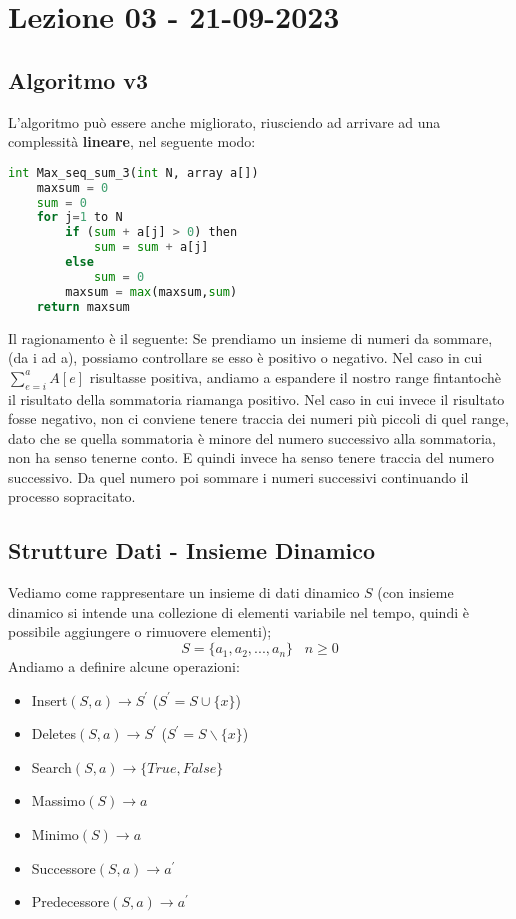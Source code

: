 \section{Lezione 03 - 21-09-2023}

\subsection{Algoritmo v3}
L'algoritmo può essere anche migliorato, riusciendo ad arrivare ad una complessità \textbf{lineare}, nel seguente modo:

\begin{lstlisting}[language=Python]
int Max_seq_sum_3(int N, array a[])
	maxsum = 0
	sum = 0
	for j=1 to N
		if (sum + a[j] > 0) then
			sum = sum + a[j]
		else
			sum = 0
		maxsum = max(maxsum,sum)
	return maxsum
\end{lstlisting}
Il ragionamento è il seguente:
Se prendiamo un insieme di numeri da sommare, (da i ad a), possiamo controllare se esso è positivo o negativo.
Nel caso in cui $\sum_{e=i}^{a} A[e]$ risultasse positiva, andiamo a espandere il nostro range fintantochè il risultato della sommatoria riamanga positivo.
Nel caso in cui invece il risultato fosse negativo, non ci conviene tenere traccia dei numeri più piccoli di quel range, dato che se quella sommatoria è minore del numero successivo alla sommatoria, non ha senso tenerne conto. E quindi invece ha senso tenere traccia del numero successivo. Da quel numero poi sommare i numeri successivi continuando il processo sopracitato.


\subsection{Strutture Dati - Insieme Dinamico}
Vediamo come rappresentare un insieme di dati dinamico $S$ (con insieme dinamico si intende una collezione di elementi variabile nel tempo, quindi è possibile aggiungere o rimuovere elementi);%
$$ S=\{a_1,a_2,...,a_n\} \;\;\; n \ge 0  $$
Andiamo a definire alcune operazioni:
\begin{itemize}
\item Insert$(S,a) \rightarrow S^{\prime}$ ($ S^{\prime} = S \cup \{x\}$)
\item Deletes$(S,a) \rightarrow S^{\prime}$ ($S^{\prime} = S \backslash \{x\}$)
\item Search$(S,a) \rightarrow \{True,False\}$
\item Massimo$(S) \rightarrow a$
\item Minimo$(S) \rightarrow a$
\item Successore$(S,a) \rightarrow a^{\prime}$
\item Predecessore$(S,a) \rightarrow a^{\prime}$
\end{itemize}